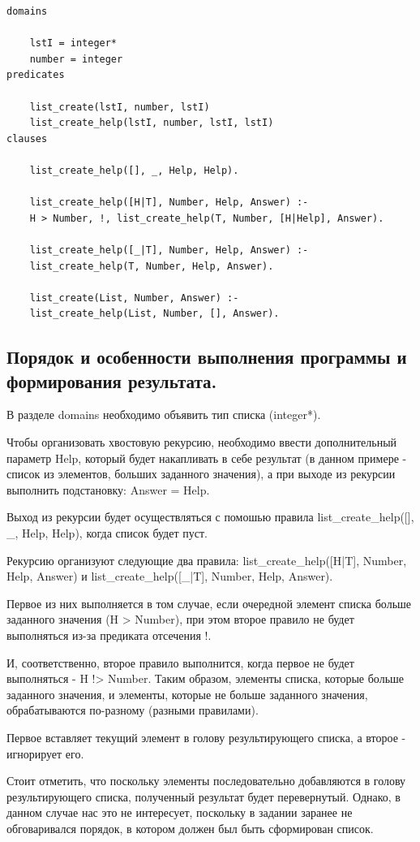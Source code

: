 \documentclass[a4paper,12pt]{article}
\begin{document}
\begin{verbatim}
domains

	lstI = integer*
	number = integer
predicates

	list_create(lstI, number, lstI)
	list_create_help(lstI, number, lstI, lstI)
clauses

	list_create_help([], _, Help, Help).
	
	list_create_help([H|T], Number, Help, Answer) :-
	H > Number, !, list_create_help(T, Number, [H|Help], Answer).
	
	list_create_help([_|T], Number, Help, Answer) :-
	list_create_help(T, Number, Help, Answer).
	
	list_create(List, Number, Answer) :-
	list_create_help(List, Number, [], Answer).
\end{verbatim}

\subsection*{Порядок и особенности выполнения программы и формирования результата.}

В разделе domains необходимо объявить тип списка (integer*).

Чтобы организовать хвостовую рекурсию, необходимо ввести дополнительный параметр Help, который будет накапливать в себе результат (в данном примере - список из элементов, больших заданного значения), а при выходе из рекурсии выполнить подстановку: Answer = Help.

Выход из рекурсии будет осуществляться с помошью правила list\_create\_help([], \_, Help, Help), когда список будет пуст.

Рекурсию организуют следующие два правила: list\_create\_help([H|T], Number, Help, Answer) и list\_create\_help([\_|T], Number, Help, Answer). 

Первое из них выполняется в том случае, если очередной элемент списка больше заданного значения (H > Number), при этом второе правило не будет выполняться из-за предиката отсечения !.

И, соответственно, второе правило выполнится, когда первое не будет выполняться - H !> Number. Таким образом, элементы списка, которые больше заданного значения, и элементы, которые не больше заданного значения, обрабатываются по-разному (разными правилами).

Первое вставляет текущий элемент в голову результирующего списка, а второе - игнорирует его.

Стоит отметить, что поскольку элементы последовательно добавляются в голову результирующего списка, полученный результат будет перевернутый. Однако, в данном случае нас это не интересует, поскольку в задании заранее не обговаривался порядок, в котором должен был быть сформирован список.
\end{document}
